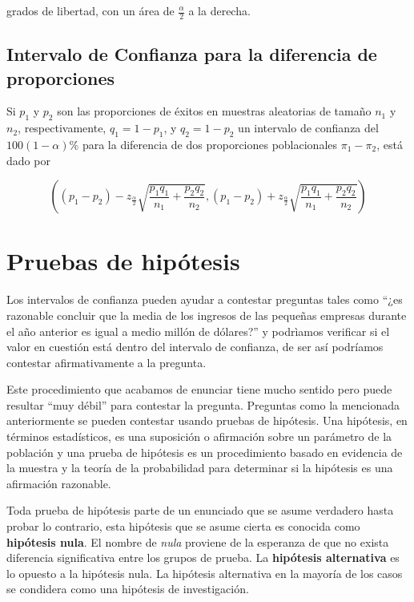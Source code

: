 \documentclass[letterpaper,]{book}
\begin{document}
grados de libertad, con un área de \(\frac{\alpha}{2}\) a la derecha.

\hypertarget{intervalo-de-confianza-para-la-diferencia-de-proporciones}{%
\subsection{Intervalo de Confianza para la diferencia de proporciones}\label{intervalo-de-confianza-para-la-diferencia-de-proporciones}}

Si \(p_1\) y \(p_2\) son las proporciones de éxitos en muestras aleatorias de tamaño \(n_1\) y \(n_2\), respectivamente, \(q_1 = 1- p_1\), y \(q_2 = 1- p_2\) un intervalo de confianza del \(100\left(1- \alpha \right)\%\) para la diferencia de dos proporciones poblacionales \(\pi_1-\pi_2\), está dado por

\begin{equation} 
\left( \left( p_1 - p_2 \right) - z_{\frac{\alpha}{2}}\sqrt{\dfrac{p_1q_1}{n_1} + \dfrac{p_2q_2}{n_2}} , \left( p_1 - p_2 \right) + z_{\frac{\alpha}{2}}\sqrt{\dfrac{p_1q_1}{n_1} + \dfrac{p_2q_2}{n_2}}  \right)
\label{eq:icprop2}
\end{equation}

\hypertarget{ph}{%
\section{Pruebas de hipótesis}\label{ph}}

Los intervalos de confianza pueden ayudar a contestar preguntas tales como ``¿es razonable concluir que la media de los ingresos de las pequeñas empresas durante el año anterior es igual a medio millón de dólares?'' y podrìamos verificar si el valor en cuestión está dentro del intervalo de confianza, de ser así podríamos contestar afirmativamente a la pregunta.

Este procedimiento que acabamos de enunciar tiene mucho sentido pero puede resultar ``muy débil'' para contestar la pregunta. Preguntas como la mencionada anteriormente se pueden contestar usando pruebas de hipótesis. Una hipótesis, en términos estadísticos, es una suposición o afirmación sobre un parámetro de la población y una prueba de hipótesis es un procedimiento basado en evidencia de la muestra y la teoría de la probabilidad para determinar si la hipótesis es una afirmación razonable.

Toda prueba de hipótesis parte de un enunciado que se asume verdadero hasta probar lo contrario, esta hipótesis que se asume cierta es conocida como \textbf{hipótesis nula}. El nombre de \emph{nula} proviene de la esperanza de que no exista diferencia significativa entre los grupos de prueba. La \textbf{hipótesis alternativa} es lo opuesto a la hipótesis nula. La hipótesis alternativa en la mayoría de los casos se condidera como una hipótesis de investigación.
\end{document}
